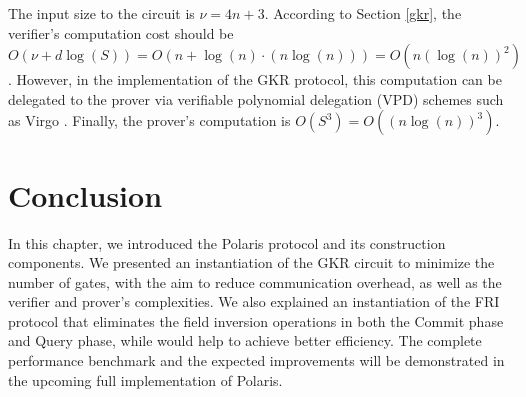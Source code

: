 The input size to the circuit is $\nu = 4n + 3$. According to Section \ref{gkr}, the verifier's computation cost should be $O(\nu + d\log(S)) = O(n + \log(n) \cdot (n\log(n))) = O(n (\log(n))^2)$. However, in the implementation of the GKR protocol, this computation can be delegated to the prover via verifiable polynomial delegation (VPD) schemes such as Virgo \cite{Zhang2020Virgo}. Finally, the prover's computation is $O(S^3)=O((n\log(n))^3)$.

\section{Conclusion}
In this chapter, we introduced the Polaris protocol and its construction components. We presented an instantiation of the GKR circuit to minimize the number of gates, with the aim to reduce communication overhead, as well as the verifier and prover's complexities. We also explained an instantiation of the FRI protocol that eliminates the field inversion operations in both the Commit phase and Query phase, while would help to achieve better efficiency.  The complete performance benchmark and the expected improvements will be demonstrated in the upcoming full implementation of Polaris.
